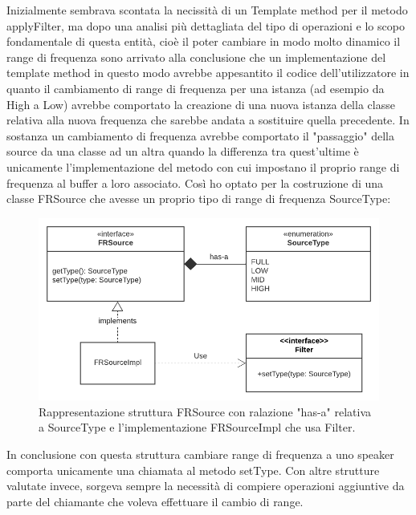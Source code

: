\documentclass[a4paper,12pt]{report}
\begin{document}
Inizialmente sembrava scontata la necissità di un Template method per il metodo applyFilter, ma dopo una analisi più dettagliata del tipo di operazioni e lo scopo 
fondamentale di questa entità, cioè il poter cambiare in modo molto dinamico il range di frequenza sono arrivato alla conclusione che un implementazione del template method in questo modo avrebbe appesantito il codice dell'utilizzatore in quanto il cambiamento di range di frequenza per una istanza (ad esempio da High a Low) avrebbe comportato la creazione di una nuova istanza della classe relativa alla nuova frequenza che sarebbe andata a sostituire quella precedente. In sostanza un cambiamento di frequenza avrebbe comportato il "passaggio" della source da una classe ad un altra quando la differenza tra quest'ultime è unicamente l'implementazione del metodo con cui impostano il proprio range di frequenza al buffer a loro associato.
Così ho optato per la costruzione di una classe FRSource che avesse un proprio tipo di range di frequenza SourceType:
%
\begin{figure}[H]
\centering{}
\includegraphics[width=\textwidth]{img/source/SourceType.png}
\caption{Rappresentazione struttura FRSource con ralazione "has-a" relativa a SourceType e l'implementazione FRSourceImpl che usa Filter.}
\label{img:sourceType}
\end{figure}

In conclusione con questa struttura cambiare range di frequenza a uno speaker comporta unicamente una chiamata al metodo setType. Con altre strutture valutate invece, sorgeva sempre la necessità di compiere operazioni aggiuntive da parte del chiamante che voleva effettuare il cambio di range.
\end{document}

